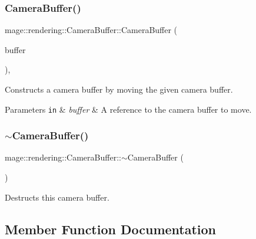 \subsubsection{\texorpdfstring{Camera\+Buffer()}{CameraBuffer()}\hspace{0.1cm}{\footnotesize\ttfamily [3/3]}}
{\footnotesize\ttfamily mage\+::rendering\+::\+Camera\+Buffer\+::\+Camera\+Buffer (\begin{DoxyParamCaption}\item[{\hyperlink{structmage_1_1rendering_1_1_camera_buffer}{Camera\+Buffer} \&\&}]{buffer }\end{DoxyParamCaption})\hspace{0.3cm}{\ttfamily [default]}, {\ttfamily [noexcept]}}

Constructs a camera buffer by moving the given camera buffer.


\begin{DoxyParams}[1]{Parameters}
\mbox{\tt in}  & {\em buffer} & A reference to the camera buffer to move. \\
\hline
\end{DoxyParams}
\hypertarget{structmage_1_1rendering_1_1_camera_buffer_aadd09f0ddad88a8463e8dda3ae4e3849}{}\label{structmage_1_1rendering_1_1_camera_buffer_aadd09f0ddad88a8463e8dda3ae4e3849} 
\subsubsection{\texorpdfstring{$\sim$\+Camera\+Buffer()}{~CameraBuffer()}}
{\footnotesize\ttfamily mage\+::rendering\+::\+Camera\+Buffer\+::$\sim$\+Camera\+Buffer (\begin{DoxyParamCaption}{ }\end{DoxyParamCaption})\hspace{0.3cm}{\ttfamily [default]}}

Destructs this camera buffer. 

\subsection{Member Function Documentation}
\hypertarget{structmage_1_1rendering_1_1_camera_buffer_a5c0b3a1e054ebcb4597f313c0346da57}{}\label{structmage_1_1rendering_1_1_camera_buffer_a5c0b3a1e054ebcb4597f313c0346da57} 
